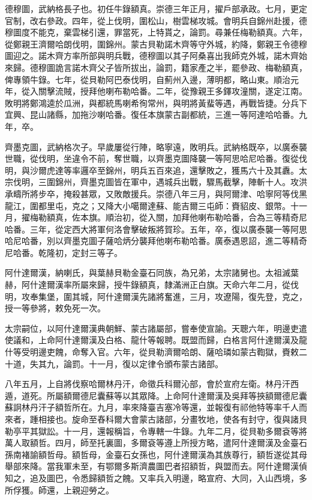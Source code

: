 \begin{pinyinscope}
德穆圖，武納格長子也。初任牛錄額真。崇德三年正月，擢戶部承政。七月，更定官制，改右參政。四年，從上伐明，圍松山，樹雲梯攻城。會明兵自錦州赴援，德穆圖度不能克，棄雲梯引還，罪當死，上特貰之，論罰。尋兼任梅勒額真。六年，從鄭親王濟爾哈朗伐明，圍錦州。蒙古貝勒諾木齊等守外城，約降，鄭親王令德穆圖迎之。諾木齊方率所部與明兵戰，德穆圖以其子阿桑喜出我師克外城，諾木齊始來歸。德穆圖詭言諾木齊父子皆所拔出，論罰，籍家產之半，罷參政、梅勒額真，俾專領牛錄。七年，從貝勒阿巴泰伐明，自薊州入邊，薄明都，略山東。順治元年，從入關擊流賊，授拜他喇布勒哈番。二年，從豫親王多鐸攻潼關，遂定江南。敗明將鄭鴻逵於瓜洲，與都統馬喇希徇常州，與明將黃蜚等遇，再戰皆捷。分兵下宜興、昆山諸縣，加拖沙喇哈番。復任本旗蒙古副都統，三進一等阿達哈哈番。九年，卒。

齊墨克圖，武納格次子。早歲屢從行陣，略寧遠，敗明兵。武納格既卒，以廣泰襲世職，從伐明，坐違令不前，奪世職，以齊墨克圖降襲一等阿思哈尼哈番。復從伐明，與沙爾虎達等率邏卒至錦州，明兵五百來追，還擊敗之，獲馬六十及其纛。太宗伐明，三圍錦州，齊墨克圖皆在軍中，遇城兵出戰，驟馬截擊，陣斬十人。攻洪承疇所將步卒，掩殺甚眾，又敗敵援兵。崇德八年三月，與阿爾津、哈寧阿等伐黑龍江，圍都里屯，克之；又降大小噶爾達蘇、能吉爾三屯師：賚貂皮、銀幣。十一月，擢梅勒額真，佐本旗。順治初，從入關，加拜他喇布勒哈番，合為三等精奇尼哈番。三年，從定西大將軍何洛會擊破叛將賀珍。五年，卒，復以廣泰襲一等阿思哈尼哈番，別以齊墨克圖子薩哈炳分襲拜他喇布勒哈番。廣泰遇恩詔，進二等精奇尼哈番。乾隆初，定封三等子。

阿什達爾漢，納喇氏，與葉赫貝勒金臺石同族，為兄弟，太宗諸舅也。太祖滅葉赫，阿什達爾漢率所屬來歸，授牛錄額真，隸滿洲正白旗。天命六年二月，從伐明，攻奉集堡，圍其城，阿什達爾漢先諸將奮進，三月，攻遼陽，復先登，克之，授一等參將，敕免死一次。

太宗嗣位，以阿什達爾漢典朝鮮、蒙古諸屬部，嘗奉使宣諭。天聰六年，明邊吏遣使議和，上命阿什達爾漢及白格、龍什等報聘。既盟而歸，白格言阿什達爾漢及龍什等受明邊吏餽，命奪入官。六年，從貝勒濟爾哈朗、薩哈璘如蒙古鞫獄，賚敕二十道，失其九，論罰。十一月，復以定律令頒布蒙古諸部。

八年五月，上自將伐察哈爾林丹汗，命徵兵科爾沁部，會於宣府左衛。林丹汗西遁，道死。所屬額爾德尼囊蘇等以其眾降。上命阿什達爾漢及吳拜等挾額爾德尼囊蘇詗林丹汗子額哲所在。九月，率來降臺吉塞冷等還，並報復有祁他特等率千人而來者，踵相接也。旋命至舂科爾大會蒙古諸部，分畫牧地，使各有封守，復與諸貝勒亭平其獄訟。十一月，還報稱旨，令專轄一牛錄。九年二月，從貝勒多爾袞等將萬人取額哲。四月，師至托裏圖，多爾袞等遵上所授方略，遣阿什達爾漢及金臺石孫南褚諭額哲母。額哲母，金臺石女孫也，阿什達爾漢為其族尊行，額哲遂從其母舉部來降。當我軍未至，有鄂爾多斯濟農圖巴者招額哲，與盟而去。阿什達爾漢偵知之，追及圖巴，令悉歸額哲之餽。又率兵入明邊，略宣府、大同，入山西境，多所俘獲。師還，上親迎勞之。


\end{pinyinscope}
